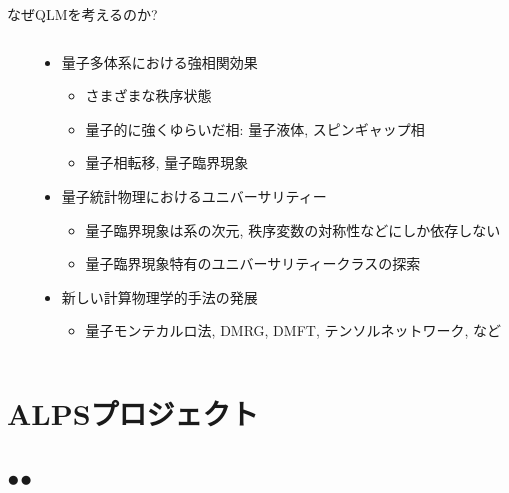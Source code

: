 \begin{frame}{なぜQLMを考えるのか?}
\begin{columns}[T]
\begin{column}{.2\textwidth}
    \end{column}
    \begin{column}{.8\textwidth}
      \begin{itemize}
      \item 量子多体系における強相関効果
        \begin{itemize}
        \item さまざまな秩序状態
        \item 量子的に強くゆらいだ相: 量子液体, スピンギャップ相
        \item 量子相転移, 量子臨界現象
        \end{itemize}
      \item 量子統計物理におけるユニバーサリティー
        \begin{itemize}
        \item 量子臨界現象は系の次元, 秩序変数の対称性などにしか依存しない
        \item 量子臨界現象特有のユニバーサリティークラスの探索
        \end{itemize}
      \item 新しい計算物理学的手法の発展
        \begin{itemize}
        \item 量子モンテカルロ法, DMRG, DMFT, テンソルネットワーク, など
        \end{itemize}
      \end{itemize}
    \end{column}
  \end{columns}
\end{frame}


  
\section{ALPSプロジェクト}
\subsection*{{\protect\color{red}●}{\protect\color{blue}●}}

